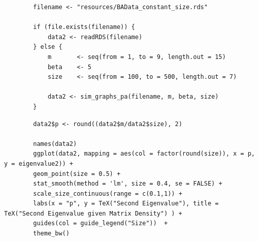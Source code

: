 \documentclass[11pt]{report}
\begin{document}
\begin{listing}[htbp]
    \begin{tcolorbox}
        \begin{verbatim}
        filename <- "resources/BAData_constant_size.rds"

        if (file.exists(filename)) {
            data2 <- readRDS(filename)
        } else {
            m       <- seq(from = 1, to = 9, length.out = 15)
            beta    <- 5
            size    <- seq(from = 100, to = 500, length.out = 7)

            data2 <- sim_graphs_pa(filename, m, beta, size)
        }
        \end{verbatim}
    \end{tcolorbox}
\caption{\label{l:baData_constant_size}l:baData\textsubscript{constant}\textsubscript{size}}
\end{listing}

\begin{listing}[htbp]
    \begin{tcolorbox}
        \begin{verbatim}
        data2$p <- round((data2$m/data2$size), 2)

        names(data2)
        ggplot(data2, mapping = aes(col = factor(round(size)), x = p, y = eigenvalue2)) +
        geom_point(size = 0.5) +
        stat_smooth(method = 'lm', size = 0.4, se = FALSE) +
        scale_size_continuous(range = c(0.1,1)) +
        labs(x = "p", y = TeX("Second Eigenvalue"), title = TeX("Second Eigenvalue given Matrix Density") ) +
        guides(col = guide_legend("Size"))  +
        theme_bw()
        \end{verbatim}
    \end{tcolorbox}
\caption{\label{l:ba_data_constant_size_plot}l:ba\textsubscript{data}\textsubscript{constant}\textsubscript{size}\textsubscript{plot}}
\end{listing}
\end{document}

